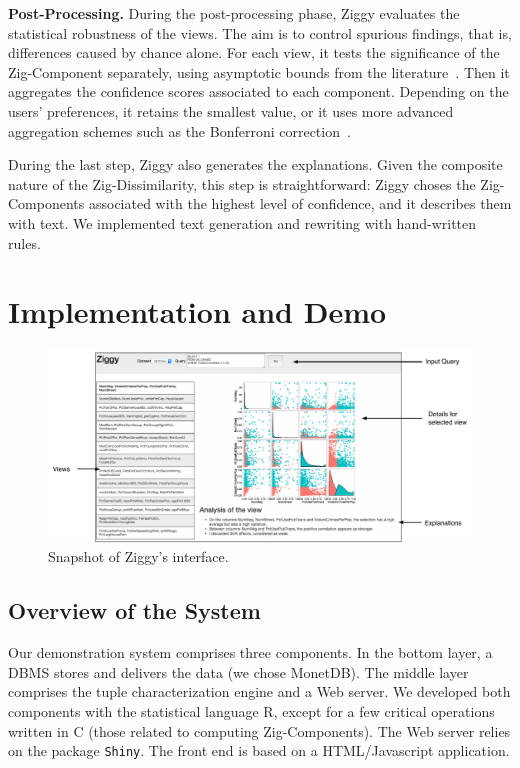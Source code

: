 \textbf{Post-Processing.} During the post-processing phase, Ziggy evaluates the
statistical robustness of the views. The aim is to control spurious findings,
that is, differences caused by chance alone. For each view, it tests the
significance of the Zig-Component separately, using asymptotic bounds from the
literature~\cite{hedges2014statistical}. Then it aggregates the confidence
scores associated to each component. Depending on the users' preferences, it
retains the smallest value, or it uses more advanced aggregation schemes such
as the Bonferroni correction~\cite{wasserman2013all}. 

During the last step, Ziggy also generates the explanations. Given the
composite nature of the Zig-Dissimilarity, this step is straightforward: Ziggy
choses the Zig-Components associated with the highest level of confidence, and
it describes them with text. We implemented text generation and rewriting
with hand-written rules.


\section{Implementation and Demo}
\label{sec:demo}

\begin{figure}[t!]
    \centering
    \includegraphics[width=\textwidth]{Images/ScreenDetail}
    \caption{Snapshot of Ziggy's interface.}
    \label{fig:screenshot}
\end{figure}

\subsection{Overview of the System}
\label{sec:archi}
Our demonstration system comprises three components. In the bottom layer, a
DBMS stores and delivers the data (we chose MonetDB). The middle layer
comprises the tuple characterization engine and a Web server. We developed both
components with the statistical language R, except for a few critical
operations written in C (those related to computing Zig-Components). The Web
server relies on the package \texttt{Shiny}. The front end is based on a
HTML/Javascript application. 

